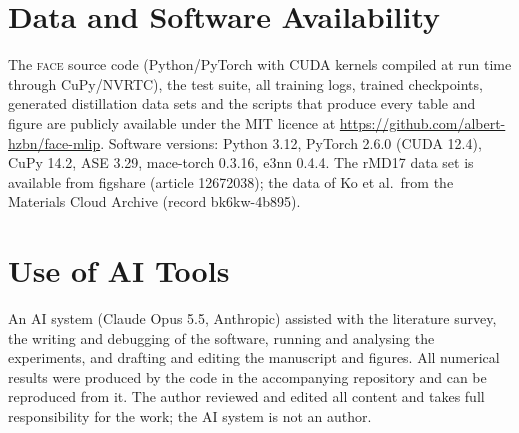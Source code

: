 \documentclass[journal=jctcce,manuscript=article,layout=traditional]{achemso}
\newcommand{\FACE}{\textup{\textsc{face}}}
\begin{document}
\section*{Data and Software Availability}
The \FACE{} source code (Python/PyTorch with CUDA kernels compiled at run time through CuPy/NVRTC), the test suite,
all training logs, trained checkpoints, generated distillation data sets and the scripts that produce every table
and figure are publicly available under the MIT licence at \url{https://github.com/albert-hzbn/face-mlip}. Software versions: Python
3.12, PyTorch 2.6.0 (CUDA 12.4), CuPy 14.2, ASE 3.29\cite{larsen2017ase}, mace-torch 0.3.16, e3nn 0.4.4. The rMD17
data set is available from figshare (article 12672038); the data of Ko et al.\ from the Materials Cloud Archive
(record bk6kw-4b895).

\section*{Use of AI Tools}
An AI system (Claude Opus 5.5, Anthropic) assisted with the literature survey, the writing and debugging of the
software, running and analysing the experiments, and drafting and editing the manuscript and figures. All numerical
results were produced by the code in the accompanying repository and can be reproduced from it. The author reviewed
and edited all content and takes full responsibility for the work; the AI system is not an author.


\end{document}

